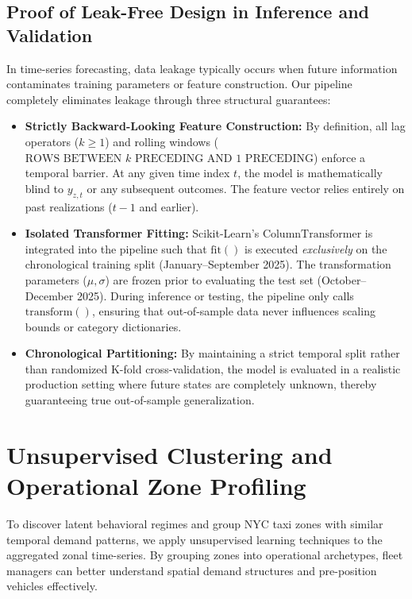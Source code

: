 \documentclass[11pt,a4paper]{article}
\begin{document}
\subsection{Proof of Leak-Free Design in Inference and Validation}
In time-series forecasting, data leakage typically occurs when future information contaminates training parameters or feature construction. Our pipeline completely eliminates leakage through three structural guarantees:
\begin{itemize}
    \item \textbf{Strictly Backward-Looking Feature Construction:} By definition, all lag operators ($k \ge 1$) and rolling windows ($\text{ROWS BETWEEN } k \text{ PRECEDING AND 1 PRECEDING}$) enforce a temporal barrier. At any given time index $t$, the model is mathematically blind to $y_{z, t}$ or any subsequent outcomes. The feature vector relies entirely on past realizations ($t-1$ and earlier).
    \item \textbf{Isolated Transformer Fitting:} Scikit-Learn's $\text{ColumnTransformer}$ is integrated into the pipeline such that $\text{fit}()$ is executed \textit{exclusively} on the chronological training split (January–September 2025). The transformation parameters ($\mu, \sigma$) are frozen prior to evaluating the test set (October–December 2025). During inference or testing, the pipeline only calls $\text{transform}()$, ensuring that out-of-sample data never influences scaling bounds or category dictionaries.
    \item \textbf{Chronological Partitioning:} By maintaining a strict temporal split rather than randomized K-fold cross-validation, the model is evaluated in a realistic production setting where future states are completely unknown, thereby guaranteeing true out-of-sample generalization.
\end{itemize}

\section{Unsupervised Clustering and Operational Zone Profiling}
To discover latent behavioral regimes and group NYC taxi zones with similar temporal demand patterns, we apply unsupervised learning techniques to the aggregated zonal time-series. By grouping zones into operational archetypes, fleet managers can better understand spatial demand structures and pre-position vehicles effectively.
\end{document}
